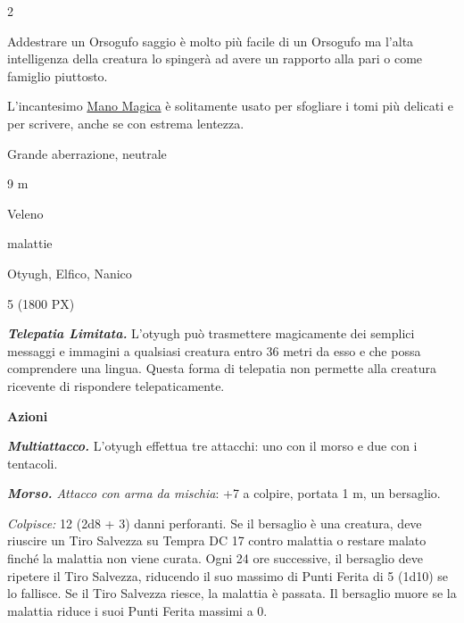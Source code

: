 \begin{multicols}{2}
{Addestrare un Orsogufo saggio è molto più facile di un Orsogufo ma l'alta intelligenza della creatura lo spingerà ad avere un rapporto alla pari o come famiglio piuttosto.

L'incantesimo \hyperlink{Mano Magica}{Mano Magica} è solitamente usato per sfogliare i tomi più delicati e per scrivere, anche se con estrema lentezza.

\begin{description}[noitemsep, topsep=0pt, parsep=0pt, partopsep=0pt, itemsep=1pt, leftmargin=2.35cm,  labelwidth=2.2cm, itemindent=0cm, listparindent=0pt] %
\setlength{\baselineskip}{10pt}
\item[\textbf{Taglia/Tipo}] Grande aberrazione, neutrale
\item[\textbf{Caratt.}] 
\item[\textbf{Punti Ferita}] 
\item[\textbf{Movimento}] 9 m
\item[\textbf{Tiri Salvez.}] 
\item[\textbf{Imm. Danni}] Veleno
\item[\textbf{Immunità}] malattie
\item[\textbf{Sensi}] 
\item[\textbf{Linguaggi}] Otyugh, Elfico, Nanico
\item[\textbf{Sfida}] 5 (1800 PX)
\end{description}
\smallskip

\emph{\textbf{Telepatia Limitata.}} L'otyugh può trasmettere magicamente dei semplici messaggi e immagini a qualsiasi creatura entro 36 metri da esso e che possa comprendere una lingua. Questa forma di telepatia non permette alla creatura ricevente di rispondere telepaticamente.

\textbf{Azioni}

\emph{\textbf{Multiattacco.}} L'otyugh effettua tre attacchi: uno con il morso e due con i tentacoli.

\emph{\textbf{Morso.} Attacco con arma da mischia}: +7 a colpire, portata 1 m, un bersaglio.

\emph{Colpisce:} 12 (2d8 + 3) danni perforanti. Se il bersaglio è una creatura, deve riuscire un Tiro Salvezza su Tempra DC 17 contro malattia o restare malato finché la malattia non viene curata. Ogni 24 ore successive, il bersaglio deve ripetere il Tiro Salvezza, riducendo il suo massimo di Punti Ferita di 5 (1d10) se lo fallisce. Se il Tiro Salvezza riesce, la malattia è passata. Il bersaglio muore se la malattia riduce i suoi Punti Ferita massimi a 0.

}
\end{multicols}

